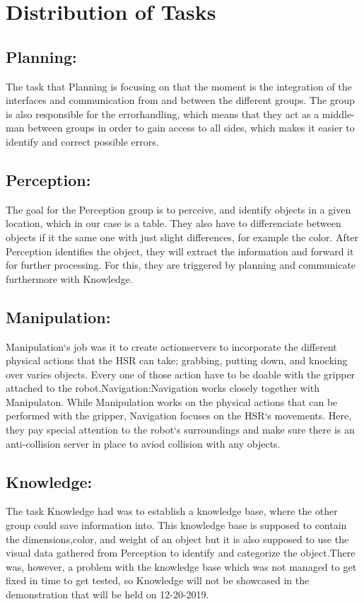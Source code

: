 \documentclass[main.tex]{subfiles}
\begin{document}
	
	\chapter{Distribution of Tasks}
		\section{Planning:}
		The task that Planning is focusing on that the moment is the integration of the interfaces and communication from and between the different groups. The group is also responsible for the errorhandling, which means that they act as a middle-man between groups in order to gain access to all sides, which makes it easier to identify and correct possible errors.
		
		\section{Perception:}
		The goal for the Perception group is to perceive, and identify objects in a given location, which in our case is a table. They also have to differenciate between objects if it the same one with just slight differences, for example the color. After Perception identifies the object, they  will extract the information and forward it for further processing. For this, they are triggered by planning and communicate furthermore with Knowledge.
		
		\section{Manipulation:}
		Manipulation‘s job was it to create actionservers to incorporate the different physical actions that the HSR can take; grabbing, putting down, and knocking over varies objects. Every one of those action have to be doable with the gripper attached to the robot.Navigation:Navigation works closely together with Manipulaton. While Manipulation works on the physical actions that can be performed with the gripper, Navigation focuses on the HSR‘s movements. Here, they pay special attention to the robot‘s surroundings and make sure there is an anti-collision server in place to aviod collision with any objects.
		
		\section{Knowledge:}
		The task Knowledge had was to establish a knowledge base, where the other group could save information into. This knowledge base is supposed to contain the dimensions,color, and weight of an object but it is also supposed to use the visual data gathered from Perception to identify and categorize the object.There was, however, a problem with the knowledge base which was not managed to get fixed in time to get tested, so Knowledge will not be showcased in the demonstration that will be held on 12-20-2019.
		
\end{document}
